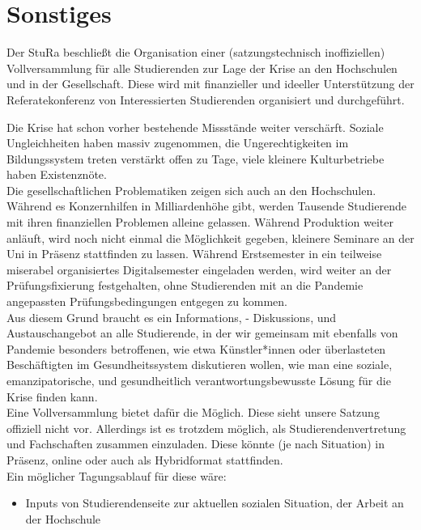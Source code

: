 \section{Sonstiges}
{
    Der StuRa beschließt die Organisation einer (satzungstechnisch inoffiziellen) Vollversammlung
    für alle Studierenden zur Lage der Krise an den Hochschulen und in der Gesellschaft.
    Diese wird mit finanzieller und ideeller Unterstützung der Referatekonferenz von Interessierten
    Studierenden organisiert und durchgeführt. 
}{
    Die Krise hat schon vorher bestehende Missstände weiter verschärft. Soziale Ungleichheiten haben
    massiv zugenommen, die Ungerechtigkeiten im Bildungssystem treten verstärkt offen zu Tage, viele
    kleinere Kulturbetriebe haben Existenznöte.\\
    Die gesellschaftlichen Problematiken zeigen sich auch an den Hochschulen. Während es Konzernhilfen
    in Milliardenhöhe gibt, werden Tausende Studierende mit ihren finanziellen Problemen alleine
    gelassen. Während Produktion weiter anläuft, wird noch nicht einmal die Möglichkeit gegeben,
    kleinere Seminare an der Uni in Präsenz stattfinden zu lassen. Während Erstsemester in ein
    teilweise miserabel organisiertes Digitalsemester eingeladen werden, wird weiter an der
    Prüfungsfixierung festgehalten, ohne Studierenden mit an die Pandemie angepassten Prüfungsbedingungen
    entgegen zu kommen.\\
    Aus diesem Grund braucht es ein Informations, - Diskussions, und Austauschangebot an alle 
    Studierende, in der wir gemeinsam mit ebenfalls von Pandemie besonders betroffenen, wie etwa
    Künstler*innen oder überlasteten Beschäftigten im Gesundheitssystem diskutieren wollen, wie man eine
    soziale, emanzipatorische, und gesundheitlich verantwortungsbewusste Lösung für die Krise finden
    kann.\\
    Eine Vollversammlung bietet dafür die Möglich. Diese sieht unsere Satzung offiziell nicht vor.
    Allerdings ist es trotzdem möglich, als Studierendenvertretung und Fachschaften zusammen einzuladen.
    Diese könnte (je nach Situation) in Präsenz, online oder auch als Hybridformat stattfinden.\\
    Ein möglicher Tagungsablauf für diese wäre:\\
    \begin{itemize}
        \item Inputs von Studierendenseite zur aktuellen sozialen Situation, der Arbeit an der Hochschule

\end{itemize}}
